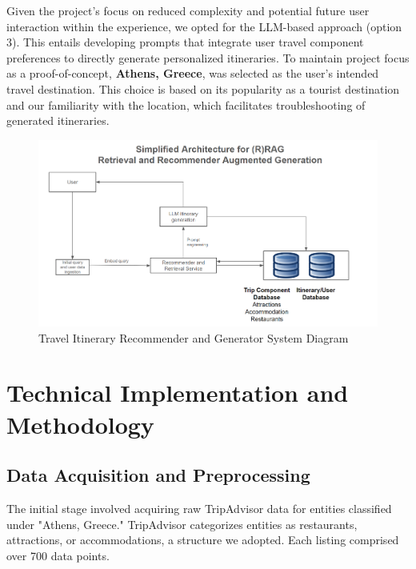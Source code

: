 \documentclass[12pt,a4paper]{report}
\begin{document}
Given the project's focus on reduced complexity and potential future user interaction within the  experience, we opted for the LLM-based approach (option 3).  This entails developing prompts that integrate user travel component preferences to directly generate personalized itineraries.
To maintain project focus as a proof-of-concept, \textbf{Athens, Greece}, was selected as the user's intended travel destination.  This choice is based on its popularity as a tourist destination and our familiarity with the location, which facilitates troubleshooting of generated itineraries.

\begin{figure}[H]
    \centering
    \includegraphics[scale=.7]{systemdiagram}
    \caption{Travel Itinerary Recommender and Generator System Diagram} 
\end{figure}



\chapter{Technical Implementation and Methodology}

\section{Data Acquisition and Preprocessing}

The initial stage involved acquiring raw TripAdvisor data for entities classified under "Athens, Greece." TripAdvisor categorizes entities as restaurants, attractions, or accommodations, a structure we adopted. Each listing comprised over 700 data points.
\end{document}
